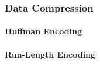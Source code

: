 \subsubsection{Data Compression}

\paragraph{Huffman Encoding}

\paragraph{Run-Length Encoding}






\begin{comment}

- Monte Carlo Methods

\end{comment}